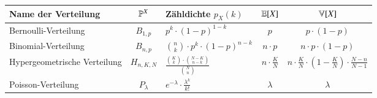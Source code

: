\begin{table}
	\renewcommand{\arraystretch}{1.6}
	\centering
	\begin{tabular}{l | c | l | c | c}
		Name der Verteilung			&	$\mathbb{P}^X$		& 	Zähldichte $p_X(k)$										& $\mathbb{E}[X]$ 				&	$\mathbb{V}[X]$
	\\ \hline
		Bernoulli-Verteilung			&	$B_{1, p}$ 	& 	$p^k \cdot (1 - p)^{1 - k}$ 									& $p$ 				&	$p \cdot (1 - p)$
	\\
		Binomial-Verteilung			&	$B_{n, p}$ 	& 	${n \choose k} \cdot p^k \cdot (1 - p)^{n - k}$ 					& $n \cdot p$ 			&	$n \cdot p \cdot (1 - p)$
	\\
		Hypergeometrische Verteilung	&	$H_{n, K, N}$	& 	$\frac{{K \choose k} \cdot {N - K \choose n - k}}{{N \choose n}}$ 	& $n \cdot \frac{K}{N}$	&	$n \cdot \frac{K}{N} \cdot (1 - \frac{K}{N}) \cdot \frac{N - n}{N - 1}$
	\\
		Poisson-Verteilung			&	$P_\lambda$ 	& 	$e^{-\lambda} \cdot \frac{\lambda^k}{k!}$						& $\lambda$ 			& 	$\lambda$
	\end{tabular}
\end{table}